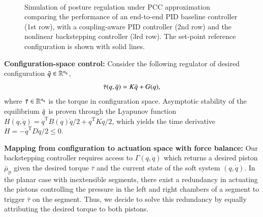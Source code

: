 \begin{figure}[ht]
  \\
  \caption{Simulation of posture regulation under \gls{PCC} approximation comparing the performance of an end-to-end PID baseline controller (1st row), with a coupling-aware PID controller (2nd row) and the nonlinear backstepping controller (3rd row). The set-point reference configuration is shown with solid lines.}
  \vspace{-0.5cm}
  \label{fig:backstepping:time_series_plots}
\end{figure}

\textbf{Configuration-space control:}
%
Consider the following regulator of desired configuration $\Bar{q} \in \mathbb{R}^{n_\mathrm{q}}$, 
%
\begin{equation}\small\label{eq:backstepping:high_level_regulation}
    \Bar{\tau}(q, \Bar{q}) = K \Bar{q} + G(q),
\end{equation}
%
where $\Bar{\tau} \in \mathbb{R}^{n_\mathrm{q}}$ is the torque in configuration space. %
%
Asymptotic stability of the equilibrium $\Bar{q}$ is proven through the Lyapunov function $H(q, \dot{q}) = \dot{q}^{\mathrm{T}} B(q) \dot{q}/2 + q^\mathrm{T} K q/2$, which yields the time derivative $\dot{H} = -\dot{q}^\mathrm{T} D \dot{q}/2 \leq 0$.

\textbf{Mapping from configuration to actuation space with force balance:}
Our backstepping controller requires access to $\Gamma(q,\dot{q})$ which returns a desired piston $\bar{\mu}_\mathrm{p}$ given the desired torque $\bar{\tau}$ and the current state of the soft system $(q,\dot{q})$. In the planar case with inextensible segments, there exist a redundancy in actuating the pistons controlling the pressure in the left and right chambers of a segment to trigger $\bar{\tau}$ on the segment. Thus, we decide to solve this redundancy by equally attributing the desired torque to both pistons.

